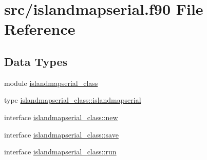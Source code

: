 \hypertarget{islandmapserial_8f90}{\section{src/islandmapserial.f90 File Reference}
\label{islandmapserial_8f90}
}
\subsection*{Data Types}
\begin{DoxyCompactItemize}
\item 
module \hyperlink{classislandmapserial__class}{islandmapserial\+\_\+class}
\item 
type \hyperlink{structislandmapserial__class_1_1islandmapserial}{islandmapserial\+\_\+class\+::islandmapserial}
\item 
interface \hyperlink{interfaceislandmapserial__class_1_1new}{islandmapserial\+\_\+class\+::new}
\item 
interface \hyperlink{interfaceislandmapserial__class_1_1save}{islandmapserial\+\_\+class\+::save}
\item 
interface \hyperlink{interfaceislandmapserial__class_1_1run}{islandmapserial\+\_\+class\+::run}
\end{DoxyCompactItemize}
